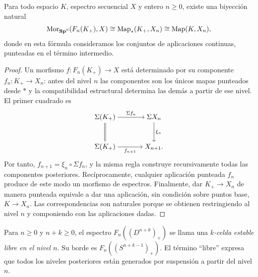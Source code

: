 \begin{lema}\label{lema:c11-adjuncion-libre}
Para todo espacio $K$, espectro secuencial $X$ y entero $n\ge0$, existe una biyección natural
\[
\operatorname{Mor}_{\mathbf{Sp}^{\mathbb N}}(F_n(K_+),X)
\cong\operatorname{Map}_*(K_+,X_n)\cong\operatorname{Map}(K,X_n),
\]
donde en esta fórmula consideramos los conjuntos de aplicaciones continuas, punteadas en el término intermedio.
\end{lema}
\begin{proof}
Un morfismo $f\colon F_n(K_+)\to X$ está determinado por su componente $f_n\colon K_+\to X_n$: antes del nivel $n$ las componentes son los únicos mapas punteados desde $*$ y la compatibilidad estructural determina las demás a partir de ese nivel. El primer cuadrado es
\[
\begin{tikzcd}[cramped,column sep=large,row sep=large]
\Sigma(K_+) \arrow[r,"\Sigma f_n"] \arrow[d,equal]
& \Sigma X_n \arrow[d,"\xi_n"]\\
\Sigma(K_+) \arrow[r,"f_{n+1}"'] & X_{n+1}.
\end{tikzcd}
\]
Por tanto, $f_{n+1}=\xi_n\circ\Sigma f_n$, y la misma regla construye recursivamente todas las componentes posteriores. Recíprocamente, cualquier aplicación punteada $f_n$ produce de este modo un morfismo de espectros. Finalmente, dar $K_+\to X_n$ de manera punteada equivale a dar una aplicación, sin condición sobre puntos base, $K\to X_n$. Las correspondencias son naturales porque se obtienen restringiendo al nivel $n$ y componiendo con las aplicaciones dadas.
\end{proof}

\begin{defi}\label{defi:c11-celda-libre}
Para $n\ge0$ y $n+k\ge0$, el espectro $F_n((D^{n+k})_+)$ se llama una \emph{$k$-celda estable libre en el nivel $n$}. Su borde es $F_n((S^{n+k-1})_+)$. El término ``libre'' expresa que todos los niveles posteriores están generados por suspensión a partir del nivel $n$.
\end{defi}

